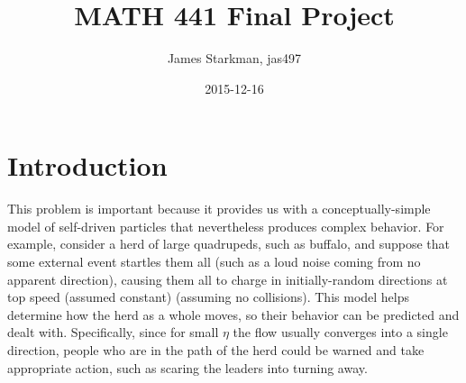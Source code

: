 \documentclass{article}
\begin{document}
\title{MATH 441 Final Project}
\author{James Starkman, jas497}
\date{2015-12-16}
\maketitle

\vspace{-1em}









\section{Introduction}

This problem is important because it provides us with a conceptually-simple
model of self-driven particles that nevertheless produces complex behavior.  For
example, consider a herd of large quadrupeds, such as buffalo, and suppose that
some external event startles them all (such as a loud noise coming from no
apparent direction), causing them all to charge in initially-random directions
at top speed (assumed constant) (assuming no collisions).  This model helps
determine how the herd as a whole moves, so their behavior can be predicted and
dealt with.  Specifically, since for small $\eta$ the flow usually converges
into a single direction, people who are in the path of the herd could be warned and 
take appropriate action, such as scaring the leaders into turning away.
\end{document}
